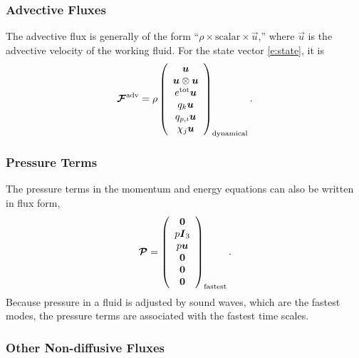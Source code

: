 \documentclass{article}
\begin{document}
{\subsubsection{Advective Fluxes}

The advective flux is generally of the form ``$\rho \times \mathrm{scalar} \times \vec{u}$,'' where $\vec{u}$ is the advective velocity of the working fluid. For the state vector \eqref{e:state}, it is 
 \begin{equation}
 \label{e:adv_flux}
 \boldsymbol{{\mathcal{F}}}^{\mathrm{adv}}=\rho \left( \begin{array}{c}
 \boldsymbol{{u}} \\
 \boldsymbol{{u}} \otimes \boldsymbol{{u}} \\
 e^{\mathrm{tot}} \boldsymbol{{u}}\\
q_k \boldsymbol{{u}}\\
q_{p,i} \boldsymbol{{u}} \\
\chi_j \boldsymbol{{u}}
\end{array}
\right)_{\mathrm{dynamical}}.
 \end{equation}

\subsubsection{Pressure Terms}

The pressure terms in the momentum and energy equations can also be written in flux form,
\begin{equation}
\boldsymbol{{\mathcal{P}}} = \left( \begin{array}{c}
\boldsymbol{{0}} \\
p \boldsymbol{{I}}_3 \\
p \boldsymbol{{u}} \\
\boldsymbol{{0}} \\
\boldsymbol{{0}} \\
\boldsymbol{{0}} 
\end{array}
\right)_{\mathrm{fastest}}.
\end{equation}
Because pressure in a fluid is adjusted by sound waves, which are the fastest modes, the pressure terms are associated with the fastest time scales. 

\subsubsection{Other Non-diffusive Fluxes}

}
\end{document}
